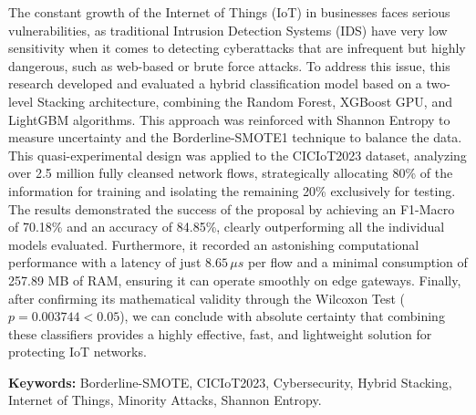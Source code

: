 The constant growth of the Internet of Things (IoT) in businesses faces serious vulnerabilities, as traditional Intrusion Detection Systems (IDS) have very low sensitivity when it comes to detecting cyberattacks that are infrequent but highly dangerous, such as web-based or brute force attacks. To address this issue, this research developed and evaluated a hybrid classification model based on a two-level Stacking architecture, combining the Random Forest, XGBoost GPU, and LightGBM algorithms. This approach was reinforced with Shannon Entropy to measure uncertainty and the Borderline-SMOTE1 technique to balance the data. This quasi-experimental design was applied to the CICIoT2023 dataset, analyzing over 2.5 million fully cleansed network flows, strategically allocating 80\% of the information for training and isolating the remaining 20\% exclusively for testing. The results demonstrated the success of the proposal by achieving an F1-Macro of 70.18\% and an accuracy of 84.85\%, clearly outperforming all the individual models evaluated. Furthermore, it recorded an astonishing computational performance with a latency of just $8.65\,\mu s$ per flow and a minimal consumption of 257.89 MB of RAM, ensuring it can operate smoothly on edge gateways. Finally, after confirming its mathematical validity through the Wilcoxon Test ($p = 0.003744 < 0.05$), we can conclude with absolute certainty that combining these classifiers provides a highly effective, fast, and lightweight solution for protecting IoT networks.

\vspace{0.5cm}
\noindent \textbf{Keywords:} Borderline-SMOTE, CICIoT2023, Cybersecurity, Hybrid Stacking, Internet of Things, Minority Attacks, Shannon Entropy.
